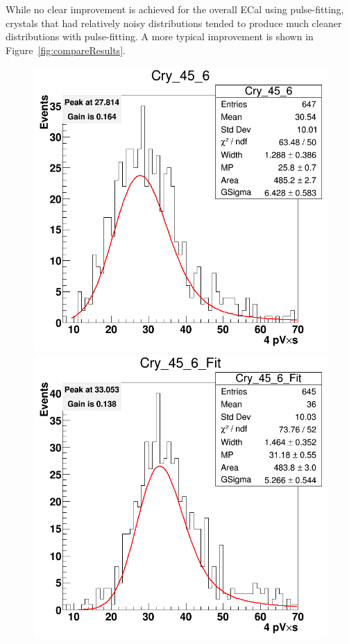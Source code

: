 \documentclass[twoside]{article}
\begin{document}
While no clear improvement is achieved for the overall ECal using pulse-fitting, crystals that had relatively noisy distributions tended to produce much cleaner distributions with pulse-fitting. A more typical improvement is shown in Figure~\ref{fig:compareResults}.\\
\begin{figure}[hbt]
\begin{minipage}{0.5\textwidth}
 \includegraphics[width=\textwidth]{pics/Cry_45_6.png}
\end{minipage}\hfill\begin{minipage}{0.5\textwidth}
 \includegraphics[width=\textwidth]{pics/Cry_45_6_Fit.png}

\end{minipage}
\end{figure}
\end{document}
